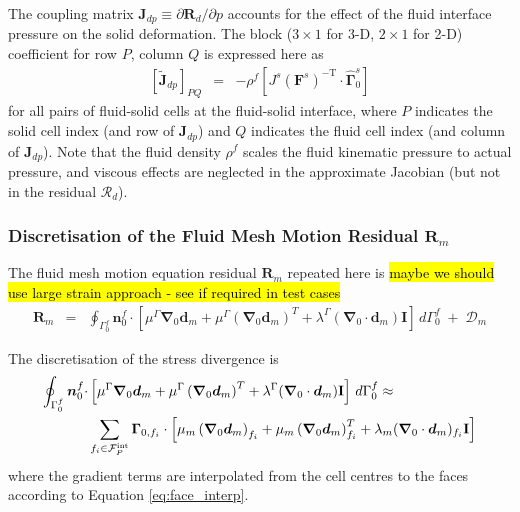 \documentclass[sn-mathphys,Numbered]{sn-jnl}%
\newcommand{\bb}{\boldsymbol}
\begin{document}
The coupling matrix $\bb{J}_{dp} \equiv \partial \bb{R}_{d}/\partial p$ accounts for the effect of the fluid interface pressure on the solid deformation. 
The block ($3\times1$ for 3-D, $2\times1$ for 2-D) coefficient for row $P$, column $Q$ is expressed here as
\begin{eqnarray}
	 \left[ \tilde{\bb{J}}_{dp} \right]_{PQ} &=& -\rho^f \left[ J^s (\bb{F}^s)^{-\text{T}} \cdot \hat{\bb{\Gamma}}_0^s \right] 
\end{eqnarray}
for all pairs of fluid-solid cells at the fluid-solid interface, where $P$ indicates the solid cell index (and row of $\bb{J}_{dp}$) and $Q$ indicates the fluid cell index (and column of $\bb{J}_{dp}$).
Note that the fluid density $\rho^f$ scales the fluid kinematic pressure to actual pressure, and viscous effects are neglected in the approximate Jacobian (but not in the residual $\bb{\mathcal{R}}_d$).



\subsubsection[Discretisation of the Fluid Mesh Motion Residual]{Discretisation of the Fluid Mesh Motion Residual $\bb{R}_m$}
The fluid mesh motion equation residual $\bb{R}_m$ repeated here is \hl{maybe we should use large strain approach - see if required in test cases}
\begin{eqnarray}
    \bb{R}_m
    &=&
    \oint_{\Gamma_0^f} \bb{n}_0^f \cdot
    \left[
    \mu^\Gamma \bb{\nabla}_0 \bb{d}_m + \mu^\Gamma \left(\bb{\nabla}_0 \bb{d}_m \right)^T
    + \lambda^\Gamma (\bb{\nabla}_0 \cdot \bb{d}_m) \textbf{I}
    \right]
    \, d\Gamma_0^f
    \;+\; \bb{\mathcal{D}}_m
\end{eqnarray}

The discretisation of the stress divergence is
\begin{align}
    \oint_{\Gamma_0^f} \bb{n}_0^f \cdot
    &\left[
    \mu^\Gamma \bb{\nabla}_0 \bb{d}_m + \mu^\Gamma \left(\bb{\nabla}_0 \bb{d}_m \right)^T
    + \lambda^\Gamma (\bb{\nabla}_0 \cdot \bb{d}_m) \textbf{I}
    \right]    \, d\Gamma_0^f
	\approx \notag \\
	&\sum_{f_i \in \mathcal{F}_P^{\text{int}}}
	\bb{\Gamma}_{0,f_i}
	\cdot
	\left[
	\mu_m \left(\bb{\nabla}_0 \bb{d}_m\right)_{f_i} + \mu_m \left(\bb{\nabla}_0 \bb{d}_m \right)^T_{f_i}
    + \lambda_m (\bb{\nabla}_0 \cdot \bb{d}_m)_{f_i} \textbf{I}
	\right]
\end{align}
where the gradient terms are interpolated from the cell centres to the faces according to Equation \ref{eq:face_interp}.
\end{document}
